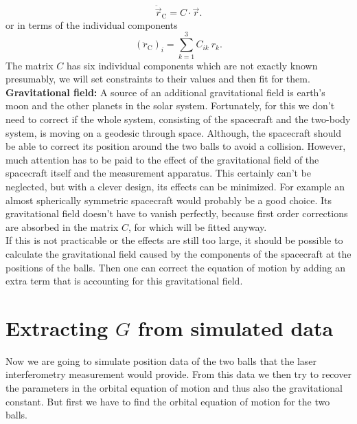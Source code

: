 \documentclass[prb,preprint]{revtex4-1}
\begin{document}
\begin{equation}
\label{eq:tidal}
\ddot{\vec{r}}_{\mathrm{C}} = C \cdot \vec{r}.
\end{equation}
or in terms of the individual components 
\begin{equation}
\label{eq:tidacom}
\left(\ddot{r}_\mathrm{C}\right)_i = \sum_{k=1}^{3} C_{ik} \: r_k.
\end{equation}
The matrix $C$ has six individual components which are not exactly known presumably, we will set constraints to their values and then fit for them. \\

\textbf{Gravitational field:}
A source of an additional gravitational field is earth's moon and the other planets in the solar system. Fortunately, for this we don't need to correct if the whole system, consisting of the spacecraft and the two-body system, is moving on a geodesic through space. Although, the spacecraft should be able to correct its position around the two balls to avoid a collision.
However, much attention has to be paid to the effect of the gravitational field of the spacecraft itself and the measurement apparatus. This certainly can't be neglected, but with a clever design, its effects can be minimized. For example an almost spherically symmetric spacecraft would probably be a good choice. Its gravitational field doesn't have to vanish perfectly, because first order corrections are absorbed in the matrix $C$, for which will be fitted anyway. \\
If this is not practicable or the effects are still too large, it should be possible to calculate the gravitational field caused by the components of the spacecraft at the positions of the balls. Then one can correct the equation of motion by adding an extra term that is accounting for this gravitational field. \\



\section{Extracting $G$ from simulated data}

Now we are going to simulate position data of the two balls that the laser interferometry measurement would provide. From this data we then try to recover the parameters in the orbital equation of motion and thus also the gravitational constant. But first we have to find the orbital equation of motion for the two balls.\\
\end{document}
